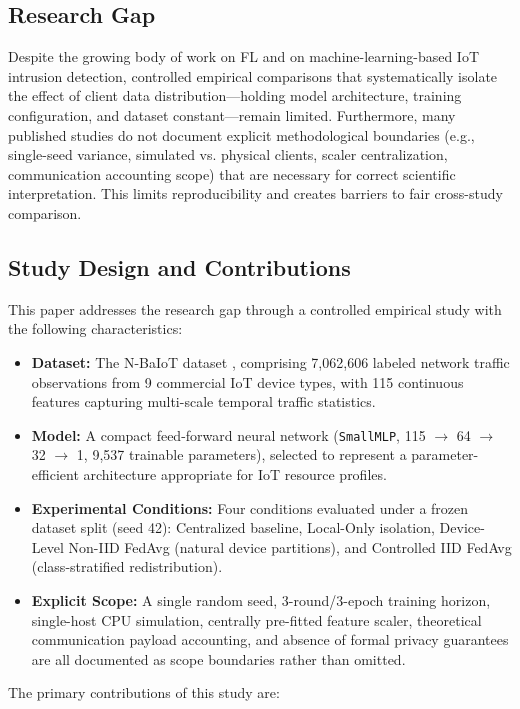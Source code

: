 \documentclass[11pt,a4paper]{article}
\begin{document}
\subsection{Research Gap}
Despite the growing body of work on FL and on machine-learning-based IoT intrusion detection, controlled empirical comparisons that systematically isolate the effect of client data distribution—holding model architecture, training configuration, and dataset constant—remain limited. Furthermore, many published studies do not document explicit methodological boundaries (e.g., single-seed variance, simulated vs. physical clients, scaler centralization, communication accounting scope) that are necessary for correct scientific interpretation. This limits reproducibility and creates barriers to fair cross-study comparison.

\subsection{Study Design and Contributions}
This paper addresses the research gap through a controlled empirical study with the following characteristics:

\begin{itemize}
    \item \textbf{Dataset:} The N-BaIoT dataset \cite{ref2}, comprising 7,062,606 labeled network traffic observations from 9 commercial IoT device types, with 115 continuous features capturing multi-scale temporal traffic statistics.
    \item \textbf{Model:} A compact feed-forward neural network (\texttt{SmallMLP}, 115 $\rightarrow$ 64 $\rightarrow$ 32 $\rightarrow$ 1, 9,537 trainable parameters), selected to represent a parameter-efficient architecture appropriate for IoT resource profiles.
    \item \textbf{Experimental Conditions:} Four conditions evaluated under a frozen dataset split (seed 42): Centralized baseline, Local-Only isolation, Device-Level Non-IID FedAvg (natural device partitions), and Controlled IID FedAvg (class-stratified redistribution).
    \item \textbf{Explicit Scope:} A single random seed, 3-round/3-epoch training horizon, single-host CPU simulation, centrally pre-fitted feature scaler, theoretical communication payload accounting, and absence of formal privacy guarantees are all documented as scope boundaries rather than omitted.
\end{itemize}

The primary contributions of this study are:
\end{document}
